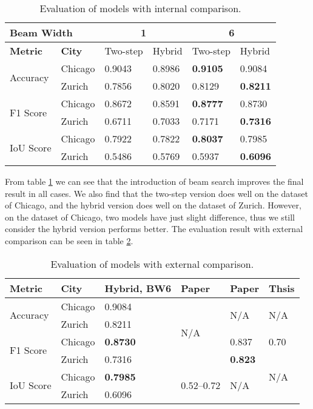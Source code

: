 \begin{table}[!h]
	\centering
	\caption[Evaluation of models with internal comparison]{Evaluation of models with internal comparison.}
	\label{tab:evalmodin}
	\begin{tabular}{l|l|l|l|l|l}
	\hline
	\multicolumn{2}{l|}{\textbf{Beam Width}} & \multicolumn{2}{c|}{1} & \multicolumn{2}{c}{6} \\ \hline
	\textbf{Metric} & \textbf{City} & Two-step & Hybrid & Two-step & Hybrid \\ \hline
	\multirow{2}{*}{Accuracy} & Chicago & 0.9043 & 0.8986 & \textbf{0.9105} & 0.9084 \\ \cline{2-6}
	& Zurich & 0.7856 & 0.8020 & 0.8129 & \textbf{0.8211} \\ \hline
	\multirow{2}{*}{F1 Score} & Chicago & 0.8672 & 0.8591 & \textbf{0.8777} & 0.8730 \\ \cline{2-6}
	& Zurich & 0.6711 & 0.7033 & 0.7171 & \textbf{0.7316} \\ \hline
	\multirow{2}{*}{IoU Score} & Chicago & 0.7922 & 0.7822 & \textbf{0.8037} & 0.7985 \\ \cline{2-6}
	& Zurich & 0.5486 & 0.5769 & 0.5937 & \textbf{0.6096} \\
	\hline
\end{tabular}
\end{table}

From table \ref{tab:evalmodin} we can see that the introduction of beam search improves the final result in all cases. We also find that the two-step version does well on the dataset of Chicago, and the hybrid version does well on the dataset of Zurich. However, on the dataset of Chicago, two models have just slight difference, thus we still consider the hybrid version performs better. The evaluation result with external comparison can be seen in table \ref{tab:evalmodex}.

\begin{table}[!h]
	\centering
	\caption[Evaluation of models with external comparison]{Evaluation of models with external comparison.}
	\label{tab:evalmodex}
	\begin{tabular}{l|l|l|l|l|l}
	\hline
	\textbf{Metric} & \textbf{City} & Hybrid, BW6 & Paper \cite{polygonrnn} & Paper \cite{mspascal} & Thsis \cite{msnadine} \\ \hline
	\multirow{2}{*}{Accuracy} & Chicago & 0.9084 & \multirow{4}{*}{N/A} & \multirow{2}{*}{N/A} & \multirow{2}{*}{N/A} \\ \cline{2-3}
	& Zurich & 0.8211 & & \\ \cline{1-3}\cline{5-6}
	\multirow{2}{*}{F1 Score} & Chicago & \textbf{0.8730} & & 0.837 & 0.70 \\ \cline{2-3}\cline{5-6}
	& Zurich & 0.7316 & & \textbf{0.823} & \multirow{3}{*}{N/A} \\ \cline{1-5}
	\multirow{2}{*}{IoU Score} & Chicago & \textbf{0.7985} & \multirow{2}{*}{0.52--0.72} & \multirow{2}{*}{N/A} & \\ \cline{2-3}
	& Zurich & 0.6096 & & & \\
	\hline
\end{tabular}
\end{table}

